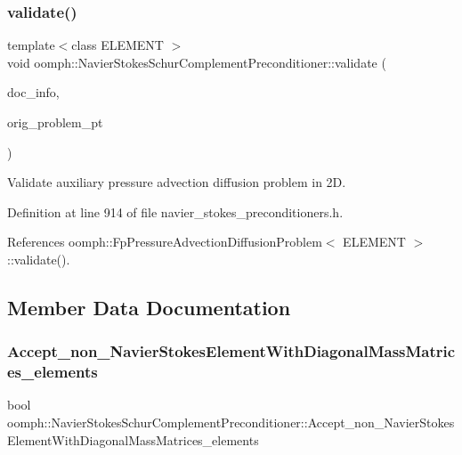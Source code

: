 \subsubsection{\texorpdfstring{validate()}{validate()}}
{\footnotesize\ttfamily template$<$class E\+L\+E\+M\+E\+NT $>$ \\
void oomph\+::\+Navier\+Stokes\+Schur\+Complement\+Preconditioner\+::validate (\begin{DoxyParamCaption}\item[{\hyperlink{classoomph_1_1DocInfo}{Doc\+Info} \&}]{doc\+\_\+info,  }\item[{\hyperlink{classoomph_1_1Problem}{Problem} $\ast$}]{orig\+\_\+problem\+\_\+pt }\end{DoxyParamCaption})\hspace{0.3cm}{\ttfamily [inline]}}



Validate auxiliary pressure advection diffusion problem in 2D. 



Definition at line 914 of file navier\+\_\+stokes\+\_\+preconditioners.\+h.



References oomph\+::\+Fp\+Pressure\+Advection\+Diffusion\+Problem$<$ E\+L\+E\+M\+E\+N\+T $>$\+::validate().



\subsection{Member Data Documentation}
\mbox{\label{classoomph_1_1NavierStokesSchurComplementPreconditioner_a31a0119eae85695e267b2b0e6d58cfe6}} 
\subsubsection{\texorpdfstring{Accept\+\_\+non\+\_\+\+Navier\+Stokes\+Element\+With\+Diagonal\+Mass\+Matrices\+\_\+elements}{Accept\_non\_NavierStokesElementWithDiagonalMassMatrices\_elements}}
{\footnotesize\ttfamily bool oomph\+::\+Navier\+Stokes\+Schur\+Complement\+Preconditioner\+::\+Accept\+\_\+non\+\_\+\+Navier\+Stokes\+Element\+With\+Diagonal\+Mass\+Matrices\+\_\+elements\hspace{0.3cm}{\ttfamily [private]}}



